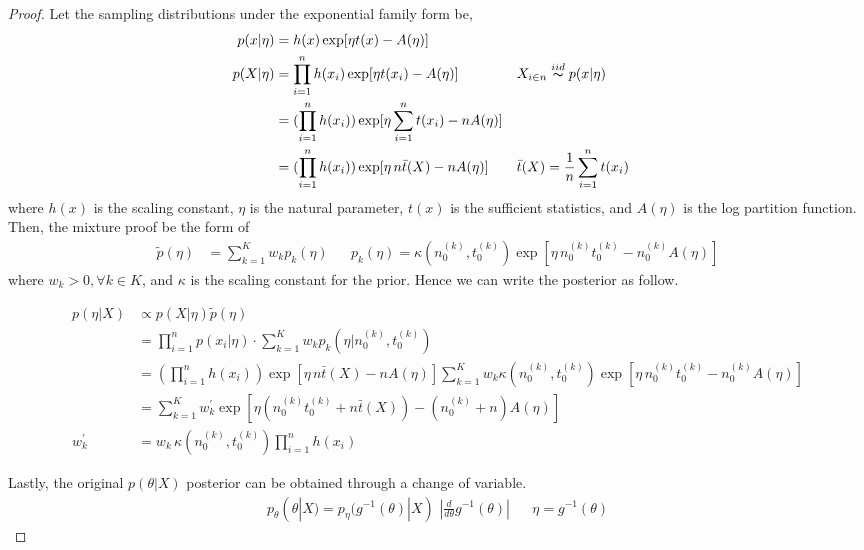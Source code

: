 \documentclass[11pt, letterpaper]{article}
\begin{document}
\begin{proof}
Let the sampling distributions under the exponential family form be,
\begin{align*}
  p(x|\eta) &= h(x)\exp[\eta t(x) - A(\eta)] \\
  p(X|\eta)
    &= \prod_{i=1}^{n} h(x_i)\exp[\eta t(x_i) - A(\eta)]
      && X_{i \in n} \overset{iid}{\thicksim} p(x|\eta) \\
    &= (\prod_{i=1}^{n} h(x_i)) \exp[\eta \sum_{i=1}^{n} t(x_i) - n A(\eta)] \\
    &= (\prod_{i=1}^{n} h(x_i)) \exp[\eta \, n \bar{t}(X) - n A(\eta)]
      && \bar{t}(X) = \frac{1}{n} \sum_{i=1}^{n} t(x_i) \\
\end{align*}
where $h(x)$ is the scaling constant, $\eta$ is the natural parameter, $t(x)$ is the sufficient statistics,
and $A(\eta)$ is the log partition function. Then, the mixture proof be the form of
\begin{align*}
  \tilde{p}(\eta) &= \sum_{k=1}^{K} w_k p_k(\eta)
    && p_k(\eta) = \kappa(n_0^{(k)}, t_0^{(k)}) \exp[\eta \, n_0^{(k)} t_0^{(k)} - n_0^{(k)} A(\eta)]
\end{align*}
where $w_k > 0, \forall k \in K$, and $\kappa$ is the scaling constant for the prior. Hence we can write
the posterior as follow.

\begin{align*}
  p(\eta|X) &\propto p(X|\eta)\tilde{p}(\eta) \\
    &= \prod_{i=1}^n p(x_i|\eta) \cdot \sum_{k=1}^{K} w_k p_k(\eta|n_0^{(k)}, t_0^{(k)}) \\
    &= (\prod_{i=1}^{n} h(x_i)) \exp[\eta \, n \bar{t}(X) - n A(\eta)]
       \sum_{k=1}^{K} w_k \kappa(n_0^{(k)}, t_0^{(k)}) \exp[\eta \, n_0^{(k)} t_0^{(k)} - n_0^{(k)} A(\eta)] \\
    &= \sum_{k=1}^{K} w_k^{\prime} \exp[\eta(n_0^{(k)} t_0^{(k)} + n\bar{t}(X)) - (n_0^{(k)} + n) A(\eta)] \\
  w_k^{\prime} &= w_k \, \kappa(n_0^{(k)}, t_0^{(k)}) \prod_{i=1}^{n} h(x_i)
\end{align*}

Lastly, the original $p(\theta|X)$ posterior can be obtained through a change of variable.
\begin{align*}
  p_{\theta}(\theta|X) = p_{\eta}(g^{-1}(\theta)|X) \,\, |\frac{d}{d\theta}g^{-1}(\theta)| && \eta = g^{-1}(\theta)
\end{align*}
\end{proof}
\newpage
\end{document}
